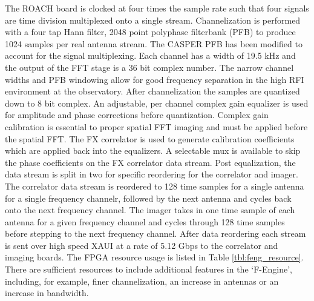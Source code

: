 \documentclass[useAMS,macros,usenatbib]{mn2e}
\begin{document}
The ROACH board is clocked at four times the sample rate such that four signals are time division multiplexed onto a single stream.
Channelization is performed with a four tap Hann filter, 2048 point polyphase filterbank (PFB) to produce 1024 samples per real antenna stream.
The CASPER PFB has been modified to account for the signal multiplexing.
Each channel has a width of 19.5 kHz and the output of the FFT stage is a 36 bit complex number.
The narrow channel widths and PFB windowing allow for good frequency separation in the high RFI environment at the observatory.
After channelization the samples are quantized down to 8 bit complex.
An adjustable, per channel complex gain equalizer is used for amplitude and phase corrections before quantization.
Complex gain calibration is essential to proper spatial FFT imaging and must be applied before the spatial FFT.
The FX correlator is used to generate calibration coefficients which are applied back into the equalizers.
A selectable mux is available to skip the phase coefficients on the FX correlator data stream.
Post equalization, the data stream is split in two for specific reordering for the correlator and imager.
The correlator data stream is reordered to 128 time samples for a single antenna for a single frequency channelr, followed by the next antenna and cycles back onto the next frequency channel.
The imager takes in one time sample of each antenna for a given frequency channel and cycles through 128 time samples before stepping to the next frequency channel.
After data reordering each stream is sent over high speed XAUI at a rate of 5.12 Gbps to the correlator and imaging boards.
The FPGA resource usage is listed in Table \ref{tbl:feng_resource}.
There are sufficient resources to include additional features in the `F-Engine', including, for example, finer channelization, an increase in antennas or an increase in bandwidth.

\end{document}
